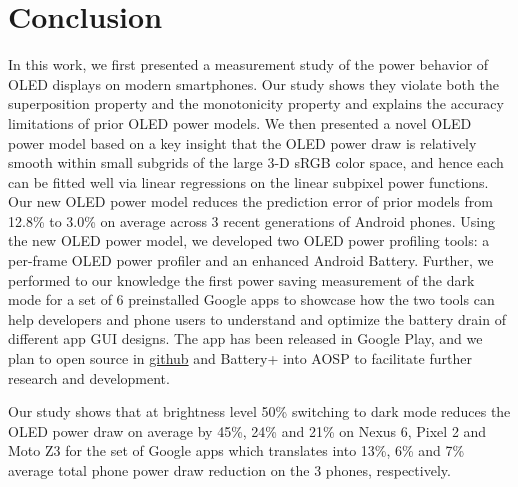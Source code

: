 \section{Conclusion}
\label{sec:conc}

In this work, we first presented a measurement study of the power behavior
of OLED displays on modern smartphones.
Our study shows they violate both the
superposition property and the monotonicity property and explains the
accuracy limitations of prior OLED power models. We then presented a
novel OLED power model based on a key
insight that the OLED power draw is relatively smooth within small
subgrids of the large 3-D sRGB color space, and hence each can be fitted
well via linear regressions on the linear subpixel power functions.
Our new OLED power model reduces the prediction error of prior models
from 12.8\% to 3.0\% on average across 3 recent generations of Android
phones.
Using the new OLED power model, we developed two OLED power
profiling tools: a per-frame OLED power profiler and an enhanced Android Battery.
%
Further, we performed to our knowledge the first power saving
measurement of the  dark mode for a set of 6 preinstalled Google
apps to showcase how the two tools can help developers
and phone users to understand and optimize the battery drain of
different app GUI designs.
The \appwithlink app
has been released in Google Play, and
we
plan to open source \name in \url{github} and Battery+ into AOSP
to facilitate further research and development.



Our study shows that at brightness level 50\%
switching to dark mode reduces the OLED
power draw on average by 45\%, 24\% and 21\% on Nexus 6,
Pixel 2 and Moto Z3 for the set of
Google apps which translates into 13\%, 6\% and 7\%
average total phone power draw reduction on the 3 phones, respectively.
\fi
